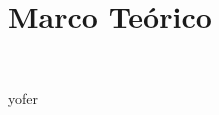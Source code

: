 \section{Marco Teórico} 
\textbf{}\\
\begin{flushleft}


\begin{itemize}



yofer
	


\end{itemize} 


\end{flushleft}


